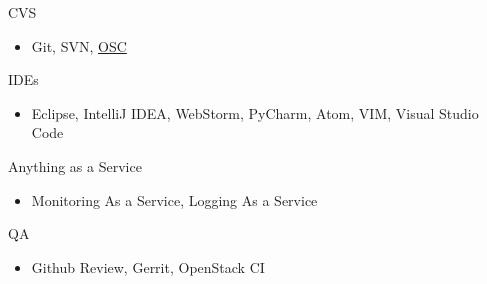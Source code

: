 \begin{cvskills}
    \cvskill
    {CVS}
    {
      \begin{itemize}[label={}]
        \item Git, SVN, \href{https://github.com/openSUSE/osc}{OSC}
      \end{itemize}
    }

    \cvskill
    {IDEs}
    {
      \begin{itemize}[label={}]
        \item Eclipse, IntelliJ IDEA, WebStorm, PyCharm, Atom, VIM, Visual Studio Code
      \end{itemize}
    }

    \cvskill
    {Anything as a Service}
    {
      \begin{itemize}[label={}]
        \item Monitoring As a Service, Logging As a Service
      \end{itemize}
    }

    \cvskill
    {QA}
    {
      \begin{itemize}[label={}]
        \item Github Review, Gerrit, OpenStack CI
      \end{itemize}
    }

\end{cvskills}
